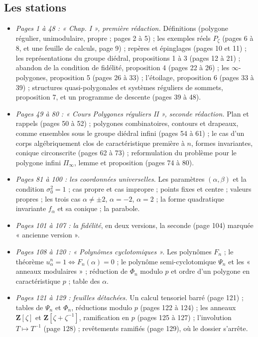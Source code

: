 \documentclass[11pt,a4paper]{article}
\begin{document}
\subsection*{Les stations}

\begin{itemize}
  \item \emph{Pages 1 à 48 : « Chap. I », première rédaction.} Définitions
    (polygone régulier, unimodulaire, propre ; pages 2 à 5) ; les exemples
    réels $P_\zeta$ (pages 6 à 8, et une feuille de calculs, page 9) ;
    repères et épinglages (pages 10 et 11) ; les représentations du groupe
    diédral, propositions 1 à 3 (pages 12 à 21) ; abandon de la condition de
    fidélité, proposition 4 (pages 22 à 26) ; les $\infty$-polygones,
    proposition 5 (pages 26 à 33) ; l'étoilage, proposition 6 (pages 33 à
    39) ; structures quasi-polygonales et systèmes réguliers de sommets,
    proposition 7, et un programme de descente (pages 39 à 48).
  \item \emph{Pages 49 à 80 : « Cours Polygones réguliers II », seconde
    rédaction.} Plan et rappels (pages 50 à 52) ; polygones combinatoires,
    contours et drapeaux, comme ensembles sous le groupe diédral infini
    (pages 54 à 61) ; le cas d'un corps algébriquement clos de
    caractéristique première à $n$, formes invariantes, conique circonscrite
    (pages 62 à 73) ; reformulation du problème pour le polygone infini
    $\Pi_\infty$, lemme et proposition (pages 74 à 80).
  \item \emph{Pages 81 à 100 : les coordonnées universelles.} Les paramètres
    $(\alpha, \beta)$ et la condition $\sigma_0^2 = 1$ ; cas propre et cas
    impropre ; points fixes et centre ; valeurs propres ; les trois cas
    $\alpha \neq \pm 2$, $\alpha = -2$, $\alpha = 2$ ; la forme quadratique
    invariante $f_\alpha$ et sa conique ; la parabole.
  \item \emph{Pages 101 à 107 : la fidélité}, en deux versions, la seconde
    (page 104) marquée « ancienne version ».
  \item \emph{Pages 108 à 120 : « Polynômes cyclotomiques ».} Les polynômes
    $F_n$ ; le théorème $u_\alpha^n = 1 \iff F_n(\alpha) = 0$ ; le polynôme
    semi-cyclotomique $\Psi_n$ et les « anneaux modulaires » ; réduction de
    $\Phi_n$ modulo $p$ et ordre d'un polygone en caractéristique $p$ ; table
    des $\alpha$.
  \item \emph{Pages 121 à 129 : feuilles détachées.} Un calcul tensoriel barré
    (page 121) ; tables de $\Psi_n$ et $\Phi_n$, réductions modulo $p$ (pages
    122 à 124) ; les anneaux $\mathbf{Z}[\zeta]$ et $\mathbf{Z}[\zeta +
    \zeta^{-1}]$, ramification en $p$ (pages 125 à 127) ; l'involution $T
    \mapsto T^{-1}$ (page 128) ; revêtements ramifiés (page 129), où le
    dossier s'arrête.
\end{itemize}
\end{document}
